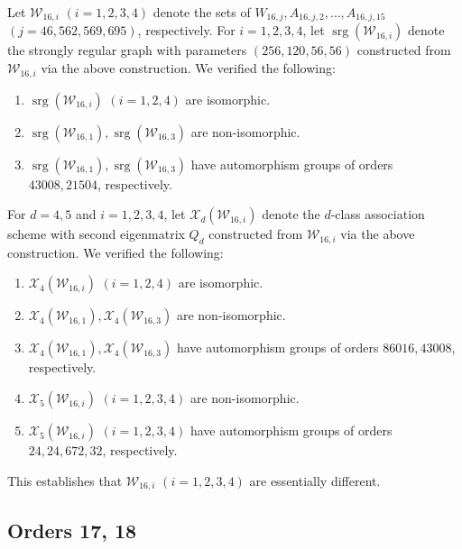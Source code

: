 \documentclass[12pt]{article}
\theoremstyle{remark}
\DeclareMathOperator{\srg}{srg}
\begin{document}
Let ${\mathcal W}_{16,i}$ $(i=1,2,3,4)$ denote 
the sets of $W_{16,j},A_{16,j,2},\ldots, A_{16,j,15}$ $(j=46,562,569,695)$, respectively.
For $i=1,2,3,4$,
let $\srg({\mathcal W}_{16,i})$ denote the strongly regular graph with parameters 
$(256,120,56,56)$ constructed from ${\mathcal W}_{16,i}$ via the above construction.
We verified the following:
\begin{enumerate}
\item
$\srg({\mathcal W}_{16,i})$ $(i=1,2,4)$ are isomorphic.
\item
$\srg({\mathcal W}_{16,1}), \srg({\mathcal W}_{16,3})$ are non-isomorphic.
\item
$\srg({\mathcal W}_{16,1}), \srg({\mathcal W}_{16,3})$
have automorphism groups of orders $43008, 21504$, respectively.
\end{enumerate}
For $d=4,5$ and $i=1,2,3,4$,
let $\mathcal{X}_d({\mathcal W}_{16,i})$ denote the $d$-class association scheme
with second eigenmatrix $Q_d$
constructed from ${\mathcal W}_{16,i}$ via the above construction.
We verified the following:
\begin{enumerate}
\item
$\mathcal{X}_4({\mathcal W}_{16,i})$ $(i=1,2,4)$ are isomorphic.
\item
$\mathcal{X}_4({\mathcal W}_{16,1}),\mathcal{X}_4({\mathcal W}_{16,3})$ are non-isomorphic.
\item
$\mathcal{X}_4({\mathcal W}_{16,1}), \mathcal{X}_4({\mathcal W}_{16,3})$
have automorphism groups of orders $86016, 43008$, respectively.
\item
$\mathcal{X}_5({\mathcal W}_{16,i})$ $(i=1,2,3,4)$ are non-isomorphic.
\item
$\mathcal{X}_5({\mathcal W}_{16,i})$ $(i=1,2,3,4)$
have automorphism groups of orders $24, 24, 672, 32$, respectively.
\end{enumerate}
This establishes that ${\mathcal W}_{16,i}$ $(i=1,2,3,4)$ are essentially different.


\subsection{Orders 17, 18}
\end{document}
